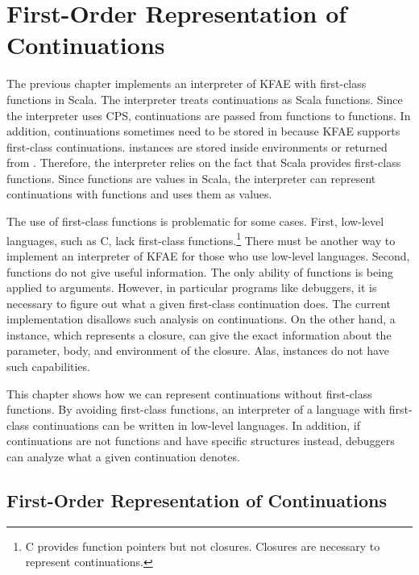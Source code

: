 
\chapter{First-Order Representation of Continuations}

\renewcommand{\Lang}{\textsf{KFAE}\xspace}

The previous chapter implements an interpreter of \Lang with first-class
functions in Scala. The interpreter treats
continuations as Scala functions. Since the interpreter uses CPS, continuations
are passed from functions to functions. In addition, continuations sometimes need to be
stored in  because \Lang supports first-class continuations.
 instances are stored inside environments or returned from
. Therefore, the interpreter relies on the fact that Scala provides
first-class functions. Since functions are values in Scala, the interpreter can
represent continuations with functions and uses them as values.

The use of first-class functions is problematic for some cases. First, low-level languages, such
as C, lack first-class functions.\footnote{C provides function pointers but not
closures. Closures are necessary to represent continuations.} There must be
another way to implement an interpreter of \Lang for those who use low-level languages.
Second, functions do not give useful information. The only ability of functions
is being applied to arguments. However, in particular programs like debuggers, it
is necessary to figure out what a given first-class continuation does. The
current implementation disallows such analysis on continuations. On the other
hand, a  instance, which represents a closure, can give the exact
information about the parameter, body, and environment of the closure. Alas,
 instances do not have such capabilities.

This chapter shows how we can represent continuations without
first-class functions. By avoiding first-class functions, an interpreter of a
language with first-class continuations can be written in low-level languages. In
addition, if continuations are not functions and have specific structures
instead, debuggers can analyze what a given continuation denotes.

\section{First-Order Representation of Continuations}


